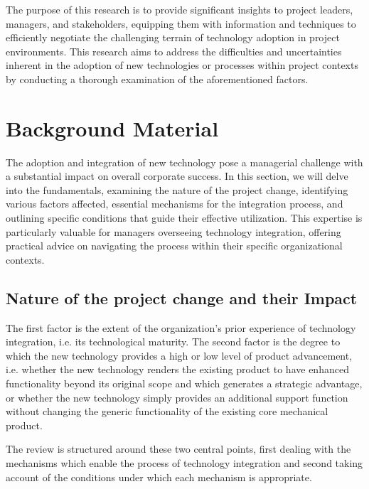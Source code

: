 \documentclass{article}
\begin{document}
The purpose of this research is to provide significant insights to project leaders, managers, and stakeholders, equipping them with information and techniques to efficiently negotiate the challenging terrain of technology adoption in project environments. This research aims to address the difficulties and uncertainties inherent in the adoption of new technologies or processes within project contexts by conducting a thorough examination of the aforementioned factors.

\section{Background Material}

The adoption and integration of new technology pose a managerial challenge with a substantial impact on overall corporate success. In this section, we will delve into the fundamentals, examining the nature of the project change, identifying various factors affected, essential mechanisms for the integration process, and outlining specific conditions that guide their effective utilization. This expertise is particularly valuable for managers overseeing technology integration, offering practical advice on navigating the process within their specific organizational contexts.

\subsection{Nature of the project change and their Impact}

The first factor is the extent of the organization’s prior experience of technology integration, i.e. its technological maturity. The second factor is the degree to which the new technology provides a high or low level of product advancement, i.e. whether the new technology renders the existing product to have enhanced functionality beyond its original scope and which generates a strategic advantage, or whether the new technology simply provides an additional support function without changing the generic functionality of the existing core mechanical product.

The review is structured around these two central points, first dealing with the mechanisms which enable the process of technology integration and second taking account of the conditions under which each mechanism is appropriate.
\end{document}
